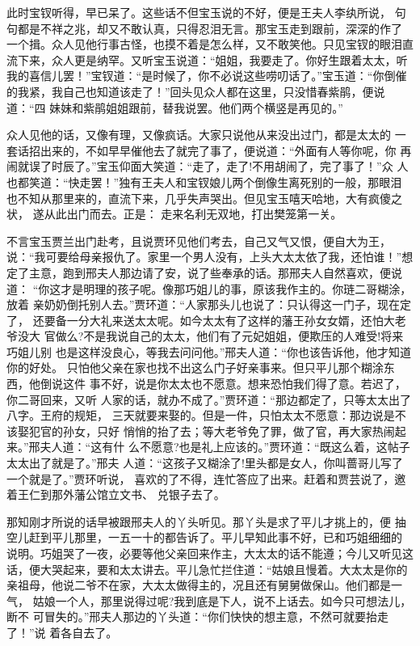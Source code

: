 此时宝钗听得，早已呆了。这些话不但宝玉说的不好，便是王夫人李纨所说，
句句都是不祥之兆，却又不敢认真，只得忍泪无言。那宝玉走到跟前，深深的作了
一个揖。众人见他行事古怪，也摸不着是怎么样，又不敢笑他。只见宝钗的眼泪直
流下来，众人更是纳罕。又听宝玉说道：“姐姐，我要走了。你好生跟着太太，听
我的喜信儿罢！”宝钗道：“是时候了，你不必说这些唠叨话了。”宝玉道：“你倒催
的我紧，我自己也知道该走了！”回头见众人都在这里，只没惜春紫鹃，便说道：“四
妹妹和紫鹃姐姐跟前，替我说罢。他们两个横竖是再见的。”

众人见他的话，又像有理，又像疯话。大家只说他从来没出过门，都是太太的
一套话招出来的，不如早早催他去了就完了事了，便说道：“外面有人等你呢，你
再闹就误了时辰了。”宝玉仰面大笑道：“走了，走了!不用胡闹了，完了事了！”众
人也都笑道：“快走罢！”独有王夫人和宝钗娘儿两个倒像生离死别的一般，那眼泪
也不知从那里来的，直流下来，几乎失声哭出。但见宝玉嘻天哈地，大有疯傻之状，
遂从此出门而去。正是：
走来名利无双地，打出樊笼第一关。

不言宝玉贾兰出门赴考，且说贾环见他们考去，自己又气又恨，便自大为王，
说：“我可要给母亲报仇了。家里一个男人没有，上头大太太依了我，还怕谁！”想
定了主意，跑到邢夫人那边请了安，说了些奉承的话。那邢夫人自然喜欢，便说道：
“你这才是明理的孩子呢。像那巧姐儿的事，原该我作主的。你琏二哥糊涂，放着
亲奶奶倒托别人去。”贾环道：“人家那头儿也说了：只认得这一门子，现在定了，
还要备一分大礼来送太太呢。如今太太有了这样的藩王孙女女婿，还怕大老爷没大
官做么?不是我说自己的太太，他们有了元妃姐姐，便欺压的人难受!将来巧姐儿别
也是这样没良心，等我去问问他。”邢夫人道：“你也该告诉他，他才知道你的好处。
只怕他父亲在家也找不出这么门子好亲事来。但只平儿那个糊涂东西，他倒说这件
事不好，说是你太太也不愿意。想来恐怕我们得了意。若迟了，你二哥回来，又听
人家的话，就办不成了。”贾环道：“那边都定了，只等太太出了八字。王府的规矩，
三天就要来娶的。但是一件，只怕太太不愿意：那边说是不该娶犯官的孙女，只好
悄悄的抬了去；等大老爷免了罪，做了官，再大家热闹起来。”邢夫人道：“这有什
么不愿意?也是礼上应该的。”贾环道：“既这么着，这帖子太太出了就是了。”邢夫
人道：“这孩子又糊涂了!里头都是女人，你叫蔷哥儿写了一个就是了。”贾环听说，
喜欢的了不得，连忙答应了出来。赶着和贾芸说了，邀着王仁到那外藩公馆立文书、
兑银子去了。

那知刚才所说的话早被跟邢夫人的丫头听见。那丫头是求了平儿才挑上的，便
抽空儿赶到平儿那里，一五一十的都告诉了。平儿早知此事不好，已和巧姐细细的
说明。巧姐哭了一夜，必要等他父亲回来作主，大太太的话不能遵；今儿又听见这
话，便大哭起来，要和太太讲去。平儿急忙拦住道：“姑娘且慢着。大太太是你的
亲祖母，他说二爷不在家，大太太做得主的，况且还有舅舅做保山。他们都是一气，
姑娘一个人，那里说得过呢?我到底是下人，说不上话去。如今只可想法儿，断不
可冒失的。”邢夫人那边的丫头道：“你们快快的想主意，不然可就要抬走了！”说
着各自去了。

